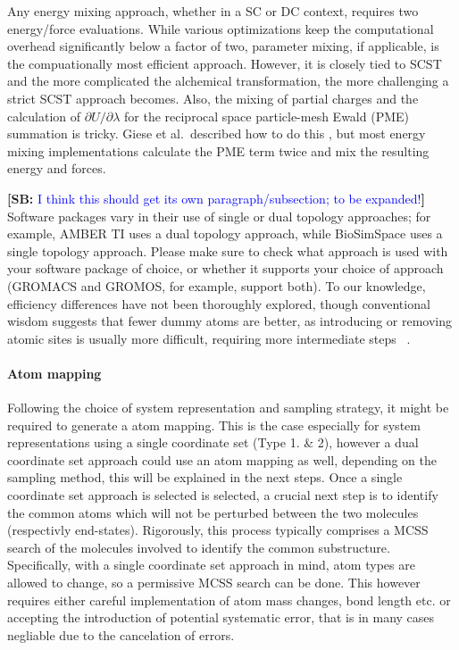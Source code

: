 \documentclass[9pt,bestpractices,pubversion]{livecoms}
\newcommand{\sbnote}[1]{%
  {\bfseries{}[SB: }%
  {\textcolor{blue}{#1}}{\bfseries{}]}
  }
\begin{document}
Any energy mixing approach, whether in a SC or DC context, requires two energy/force evaluations. While various optimizations keep the computational overhead significantly below a factor of two,  parameter mixing, if applicable, is the compuationally most efficient approach. However, it is closely tied to SCST and the more complicated the alchemical transformation, the more challenging a strict SCST approach becomes. Also, the mixing of partial charges and the calculation of $\partial U/\partial\lambda$ for the reciprocal space particle-mesh Ewald (PME) summation is tricky. Giese et al.\ described how to do this \cite{Giese_2018}, but most energy mixing implementations calculate the PME term twice and mix the resulting energy and forces.

\sbnote{I think this should get its own paragraph/subsection; to be expanded!} Software packages vary in their use of single or dual topology approaches; for example, AMBER TI uses a dual topology approach, while BioSimSpace uses a single topology approach. Please make sure to check what approach is used with your software package of choice, or whether it supports your choice of approach (GROMACS and GROMOS, for example, support both). 
To our knowledge, efficiency differences have not been thoroughly explored, though conventional wisdom suggests that fewer dummy atoms are better, as introducing or removing atomic sites is usually more difficult, requiring more intermediate steps ~\cite{liu2013lead, mobley2012perspective}.

\paragraph{Atom mapping}
Following the choice of system representation and sampling strategy, it might be required to generate a atom mapping. This is the case especially for system representations using a single coordinate set (Type 1. & 2), however a dual coordinate set approach could use an atom mapping as well, depending on the sampling method, this will be explained in the next steps.
Once a single coordinate set approach is selected is selected, a crucial next step is to identify the common atoms which will not be perturbed between the two molecules (respectivly end-states).
Rigorously, this process typically comprises a MCSS search of the molecules involved to identify the common substructure.
Specifically, with a single coordinate set approach in mind, atom types are allowed to change, so a permissive MCSS search can be done. This however requires either careful implementation of atom mass changes, bond length etc. or accepting the introduction of potential systematic error, that is in many cases negliable due to the cancelation of errors. \cite{ries2024Kartograf}
\end{document}
